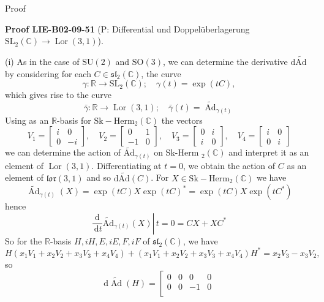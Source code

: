 \documentclass[10pt, letterpaper]{article}
\newcommand{\CustomHeading}[3]{%
  \par\medskip\noindent%
  \textbf{#1 #2} \textnormal{(#3)}.\enskip%
}
\newenvironment{PROOF}[2]{\begin{unitbox}\CustomHeading{Proof}{#1}{#2}}{\end{unitbox}}
\begin{document}
Proof


\begin{PROOF}{LIE-B02-09-51}{P: Differential und Doppelüberlagerung \(\mathrm{SL}_2(\mathbb{C})\to \operatorname{Lor}(3,1)\)}
(i) As in the case of $\mathrm{SU}(2)$ and $\mathrm{SO}(3)$, we can determine the derivative $\mathrm{d} \widetilde{\mathrm{Ad}}$ by considering for each $C \in \mathfrak{s l}_{2}(\mathbb{C})$, the curve
$$
\gamma: \mathbb{R} \longrightarrow \mathrm{SL}_{2}(\mathbb{C}) ; \quad \gamma(t)=\exp (t C),
$$
which gives rise to the curve
$$
\bar{\gamma}: \mathbb{R} \longrightarrow \operatorname{Lor}(3,1) ; \quad \bar{\gamma}(t)=\widetilde{\operatorname{Ad}}_{\gamma(t)}
$$
Using as an $\mathbb{R}$-basis for $\mathrm{Sk}-\mathrm{Herm}_{2}(\mathbb{C})$ the vectors
$$
V_{1}=\left[\begin{array}{rr}
i & 0 \\
0 & -i
\end{array}\right], \quad V_{2}=\left[\begin{array}{rr}
0 & 1 \\
-1 & 0
\end{array}\right], \quad V_{3}=\left[\begin{array}{cc}
0 & i \\
i & 0
\end{array}\right], \quad V_{4}=\left[\begin{array}{cc}
i & 0 \\
0 & i
\end{array}\right]
$$
we can determine the action of $\widetilde{\mathrm{Ad}}_{\gamma(t)}$ on Sk-Herm ${ }_{2}(\mathbb{C})$ and interpret it as an element of $\operatorname{Lor}(3,1)$. Differentiating at $t=0$, we obtain the action of $C$ as an element of $\mathfrak{l o r}(3,1)$ and so $\mathrm{d} \widetilde{\mathrm{Ad}}(C)$. For $X \in \mathrm{Sk}-\mathrm{Herm}_{2}(\mathbb{C})$ we have
$$
\widetilde{\operatorname{Ad}}_{\gamma(t)}(X)=\exp (t C) X \exp (t C)^{*}=\exp (t C) X \exp \left(t C^{*}\right)
$$
hence
$$
\left.\frac{\mathrm{d}}{\mathrm{~d} t} \widetilde{\mathrm{Ad}}_{\gamma(t)}(X) \right\rvert\, t=0=C X+X C^{*}
$$
So for the $\mathbb{R}$-basis $H, i H, E, i E, F, i F$ of $\mathfrak{s l}_{2}(\mathbb{C})$, we have
$$
H\left(x_{1} V_{1}+x_{2} V_{2}+x_{3} V_{3}+x_{4} V_{4}\right)+\left(x_{1} V_{1}+x_{2} V_{2}+x_{3} V_{3}+x_{4} V_{4}\right) H^{*}=x_{2} V_{3}-x_{3} V_{2},
$$
so
$$
\mathrm{d} \widetilde{\operatorname{Ad}}(H)=\left[\begin{array}{rrrr}
0 & 0 & 0 & 0 \\
0 & 0 & -1 & 0 \\

\end{array}$$
\end{PROOF}
\end{document}
